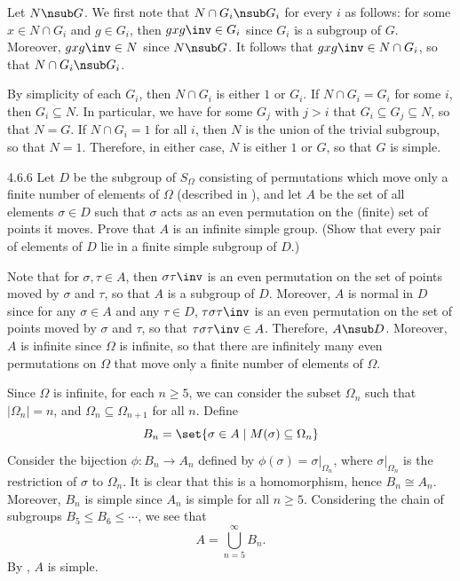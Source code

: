\begin{sol}
	Let $N \nsub G$.
	We first note that $N \cap G_i \nsub G_i$ for every $i$ as follows: for some $x \in N \cap G_i$ and $g \in G_i$, then $gxg\inv \in G_i$ since $G_i$ is a subgroup of $G$.
	Moreover, $gxg\inv \in N$ since $N \nsub G$.
	It follows that $gxg\inv \in N \cap G_i$, so that $N \cap G_i \nsub G_i$.

	By simplicity of each $G_i$, then $N \cap G_i$ is either $1$ or $G_i$.
	If $N \cap G_i = G_i$ for some $i$, then $G_i \subseteq N$.
	In particular, we have for some $G_j$ with $j > i$ that $G_i \subseteq G_j \subseteq N$, so that $N = G$.
	If $N \cap G_i = 1$ for all $i$, then $N$ is the union of the trivial subgroup, so that $N = 1$.
	Therefore, in either case, $N$ is either $1$ or $G$, so that $G$ is simple.
\end{sol}

\begin{exercise}{4.6.6}
	Let $D$ be the subgroup of $S_\Omega$ consisting of permutations which move only a finite number of elements of $\Omega$ (described in ), and let $A$ be the set of all elements $\sigma \in D$ such that $\sigma$ acts as an even permutation on the (finite) set of points it moves.
	Prove that $A$ is an infinite simple group. (Show that every pair of elements of $D$ lie in a finite simple subgroup of $D$.)
\end{exercise}

\begin{sol}
	Note that for $\sigma, \tau \in A$, then $\sigma\tau\inv$ is an even permutation on the set of points moved by $\sigma$ and $\tau$, so that $A$ is a subgroup of $D$.
	Moreover, $A$ is normal in $D$ since for any $\sigma \in A$ and any $\tau \in D$, $\tau\sigma\tau\inv$ is an even permutation on the set of points moved by $\sigma$ and $\tau$, so that $\tau\sigma\tau\inv \in A$.
	Therefore, $A \nsub D$.
	Moreover, $A$ is infinite since $\Omega$ is infinite, so that there are infinitely many even permutations on $\Omega$ that move only a finite number of elements of $\Omega$.

	Since $\Omega$ is infinite, for each $n \geq 5$, we can consider the subset $\Omega_n$ such that $|\Omega_n| = n$, and $\Omega_n \subseteq \Omega_{n + 1}$ for all $n$.
	Define
	\[
		B_n = \set{\sigma \in A \mid M(\sigma) \subseteq \Omega_n}
	\]
	Consider the bijection $\phi : B_n \to A_n$ defined by $\phi(\sigma) = \sigma|_{\Omega_n}$, where $\sigma|_{\Omega_n}$ is the restriction of $\sigma$ to $\Omega_n$.
	It is clear that this is a homomorphism, hence $B_n \cong A_n$.
	Moreover, $B_n$ is simple since $A_n$ is simple for all $n \geq 5$.
	Considering the chain of subgroups $B_5 \leq B_6 \leq \cdots$, we see that
	\[
		A = \bigcup_{n = 5}^\infty B_n.
	\]
	By , $A$ is simple.
\end{sol}

